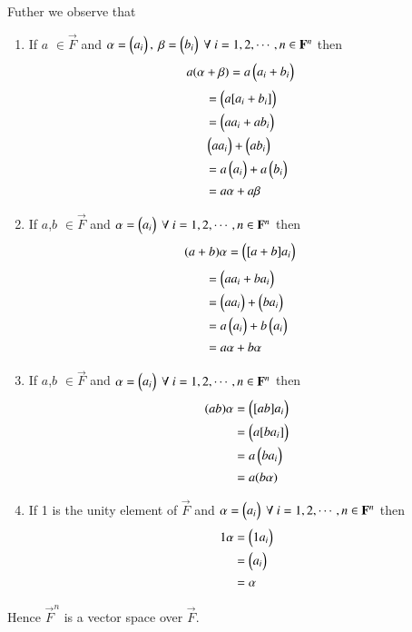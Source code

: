 \documentclass[journal,12pt,twocolumn]{IEEEtran}
\begin{document}
Futher we observe that
\begin{enumerate}
\item If $a$ $\in \vec{F}$ and 
	$\mathbf{\alpha} = \begin{pmatrix}a_i\end{pmatrix}, \
		\mathbf{\beta}=\begin{pmatrix}b_i\end{pmatrix} \ \forall \ i=1,2,\cdots,n \in \mathbf{F}^n$ 
then
\begin{align}
	a(\mathbf{\alpha}+\mathbf{\beta}) &=
	a\begin{pmatrix}a_i+b_i\end{pmatrix} 
\end{align}
\begin{align}
	&=\begin{pmatrix}a[a_i+b_i]\end{pmatrix} \\
	&=\begin{pmatrix}aa_i+ab_i\end{pmatrix} \\
	&\begin{pmatrix}aa_i\end{pmatrix}
	+ \begin{pmatrix}ab_i\end{pmatrix} \\
	&=a\begin{pmatrix}a_i\end{pmatrix}
	+ a\begin{pmatrix}b_i\end{pmatrix} \\
	&=a\alpha+a\beta
\end{align}
\item If $a$,$b$ $\in \vec{F}$ and 
	$\alpha=\myvec{a_i} \ \forall \ i=1,2,\cdots,n \in \vec{F}^n$ then
\begin{align}
	(a+b)\alpha
	&=\begin{pmatrix}[a+b]a_i\end{pmatrix} 
\end{align}
\begin{align}
	&=\begin{pmatrix}aa_i+ba_i\end{pmatrix} \\ 
	&=\begin{pmatrix}aa_i\end{pmatrix}+\begin{pmatrix}ba_i\end{pmatrix} \\
	&=a\begin{pmatrix}a_i\end{pmatrix}+b\begin{pmatrix}a_i\end{pmatrix} \\
	&=a\alpha+b\alpha
\end{align}
\item If $a$,$b$ $\in \vec{F}$ and 
	$\alpha=\myvec{a_i} \ \forall \ i=1,2,\cdots,n \in \vec{F}^n$ 
then
\begin{align}
     (ab)\alpha&=\begin{pmatrix}[ab]a_i\end{pmatrix} \\
	  &=\begin{pmatrix}a[ba_i]\end{pmatrix} \\
	  &=a\begin{pmatrix}ba_i\end{pmatrix} \\
	  &=a(b\alpha)
\end{align}
\item If 1 is the unity element of $\vec{F}$ and 
	$\alpha=\myvec{a_i} \ \forall \ i=1,2,\cdots,n \in \vec{F}^n$ then
\begin{align}
	1\alpha &=\begin{pmatrix}1a_i\end{pmatrix} \\
		&=\begin{pmatrix}a_i\end{pmatrix} \\
		&= \alpha
\end{align}
\end{enumerate}
Hence $\vec{F}^n$ is a vector space over $\vec{F}$.
\end{document}
